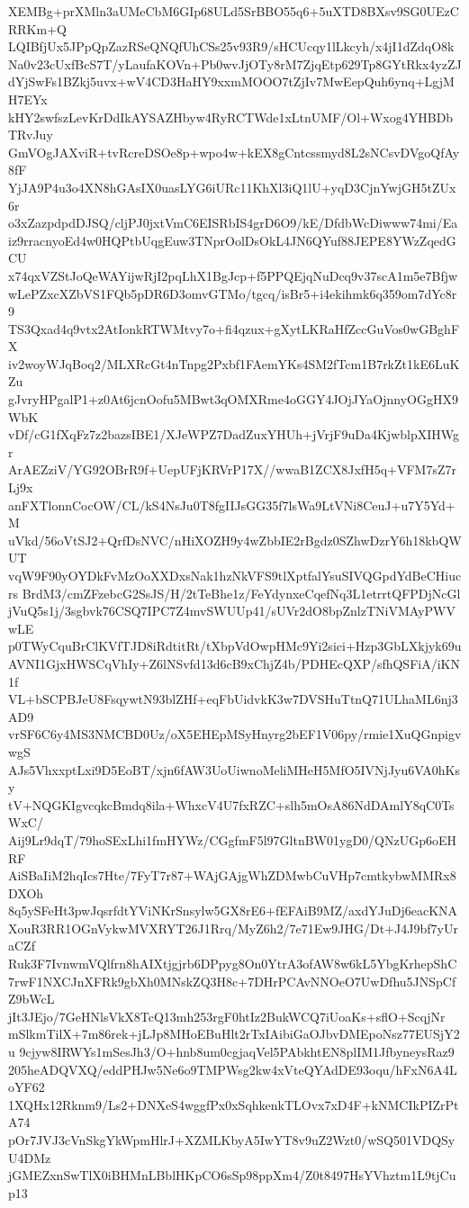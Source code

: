 XEMBg+prXMln3aUMeCbM6GIp68ULd5SrBBO55q6+5uXTD8BXsv9SG0UEzCRRKm+Q
LQIBfjUx5JPpQpZazRSeQNQfUhCSs25v93R9/sHCUcqy1lLkcyh/x4jI1dZdqO8k
Na0v23cUxfBcS7T/yLaufaKOVn+Pb0wvJjOTy8rM7ZjqEtp629Tp8GYtRkx4yzZJ
dYjSwFs1BZkj5uvx+wV4CD3HaHY9xxmMOOO7tZjIv7MwEepQuh6ynq+LgjMH7EYx
kHY2swfszLevKrDdIkAYSAZHbyw4RyRCTWde1xLtnUMF/Ol+Wxog4YHBDbTRvJuy
GmVOgJAXviR+tvRcreDSOe8p+wpo4w+kEX8gCntcssmyd8L2sNCsvDVgoQfAy8fF
YjJA9P4u3o4XN8hGAsIX0uasLYG6iURc11KhXl3iQ1lU+yqD3CjnYwjGH5tZUx6r
o3xZazpdpdDJSQ/cljPJ0jxtVmC6EISRbIS4grD6O9/kE/DfdbWcDiwww74mi/Ea
iz9rracnyoEd4w0HQPtbUqgEuw3TNprOolDsOkL4JN6QYuf88JEPE8YWzZqedGCU
x74qxVZStJoQeWAYijwRjI2pqLhX1BgJcp+f5PPQEjqNuDcq9v37scA1m5e7Bfjw
wLePZxcXZbVS1FQb5pDR6D3omvGTMo/tgcq/isBr5+i4ekihmk6q359om7dYc8r9
TS3Qxad4q9vtx2AtIonkRTWMtvy7o+fi4qzux+gXytLKRaHfZccGuVos0wGBghFX
iv2woyWJqBoq2/MLXRcGt4nTnpg2Pxbf1FAemYKs4SM2fTcm1B7rkZt1kE6LuKZu
gJvryHPgalP1+z0At6jcnOofu5MBwt3qOMXRme4oGGY4JOjJYaOjnnyOGgHX9WbK
vDf/cG1fXqFz7z2bazsIBE1/XJeWPZ7DadZuxYHUh+jVrjF9uDa4KjwblpXIHWgr
ArAEZziV/YG92OBrR9f+UepUFjKRVrP17X//wwaB1ZCX8JxfH5q+VFM7sZ7rLj9x
anFXTlonnCocOW/CL/kS4NsJu0T8fgIIJsGG35f7lsWa9LtVNi8CeuJ+u7Y5Yd+M
uVkd/56oVtSJ2+QrfDsNVC/nHiXOZH9y4wZbbIE2rBgdz0SZhwDzrY6h18kbQWUT
vqW9F90yOYDkFvMzOoXXDxsNak1hzNkVFS9tlXptfalYsuSIVQGpdYdBeCHiucrs
BrdM3/cmZFzebcG2SsJS/H/2tTeBhe1z/FeYdynxeCqefNq3L1etrrtQFPDjNcGl
jVuQ5s1j/3sgbvk76CSQ7IPC7Z4mvSWUUp41/sUVr2dO8bpZnlzTNiVMAyPWVwLE
p0TWyCquBrClKVfTJD8iRdtitRt/tXbpVdOwpHMc9Yi2sici+Hzp3GbLXkjyk69u
AVNI1GjxHWSCqVhIy+Z6lNSvfd13d6cB9xChjZ4b/PDHEcQXP/sfhQSFiA/iKN1f
VL+bSCPBJeU8FsqywtN93blZHf+eqFbUidvkK3w7DVSHuTtnQ71ULhaML6nj3AD9
vrSF6C6y4MS3NMCBD0Uz/oX5EHEpMSyHnyrg2bEF1V06py/rmie1XuQGnpigvwgS
AJs5VhxxptLxi9D5EoBT/xjn6fAW3UoUiwnoMeliMHeH5MfO5IVNjJyu6VA0hKsy
tV+NQGKIgvcqkcBmdq8ila+WhxcV4U7fxRZC+slh5mOsA86NdDAmlY8qC0TsWxC/
Aij9Lr9dqT/79hoSExLhi1fmHYWz/CGgfmF5l97GltnBW01ygD0/QNzUGp6oEHRF
AiSBaIiM2hqIcs7Hte/7FyT7r87+WAjGAjgWhZDMwbCuVHp7cmtkybwMMRx8DXOh
8q5ySFeHt3pwJqsrfdtYViNKrSnsylw5GX8rE6+fEFAiB9MZ/axdYJuDj6eacKNA
XouR3RR1OGnVykwMVXRYT26J1Rrq/MyZ6h2/7e71Ew9JHG/Dt+J4J9bf7yUraCZf
Ruk3F7IvnwmVQlfrn8hAIXtjgjrb6DPpyg8On0YtrA3ofAW8w6kL5YbgKrhepShC
7rwF1NXCJnXFRk9gbXh0MNskZQ3H8c+7DHrPCAvNNOeO7UwDfhu5JNSpCfZ9bWcL
jIt3JEjo/7GeHNlsVkX8TcQ13mh253rgF0htIz2BukWCQ7iUoaKs+sflO+ScqjNr
mSlkmTilX+7m86rek+jLJp8MHoEBuHlt2rTxIAibiGaOJbvDMEpoNsz77EUSjY2u
9cjyw8IRWYs1mSesJh3/O+hnb8um0cgjaqVel5PAbkhtEN8plIM1JfbyneysRaz9
205heADQVXQ/eddPHJw5Ne6o9TMPWsg2kw4xVteQYAdDE93oqu/hFxN6A4LoYF62
1XQHx12Rknm9/Ls2+DNXeS4wggfPx0xSqhkenkTLOvx7xD4F+kNMCIkPIZrPtA74
pOr7JVJ3cVnSkgYkWpmHlrJ+XZMLKbyA5IwYT8v9uZ2Wzt0/wSQ501VDQSyU4DMz
jGMEZxnSwTlX0iBHMnLBblHKpCO6sSp98ppXm4/Z0t8497HsYVhztm1L9tjCup13
